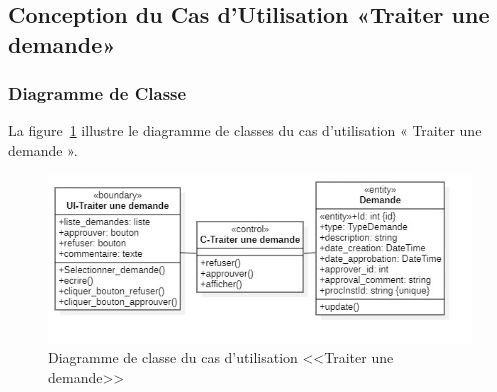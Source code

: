 \subsection{Conception du Cas d'Utilisation «Traiter une demande»}

\subsubsection{Diagramme de Classe}
La figure~\ref{fig:Traiter_demande_classe} illustre le diagramme de classes du cas d'utilisation « Traiter une demande ».

\begin{figure}[h]
     \centering
     \includegraphics[width=15cm]{images/C-tdem.jpg}
     \caption{Diagramme de classe du cas d'utilisation <<Traiter une demande>>}
     \label{fig:Traiter_demande_classe}
\end{figure}


